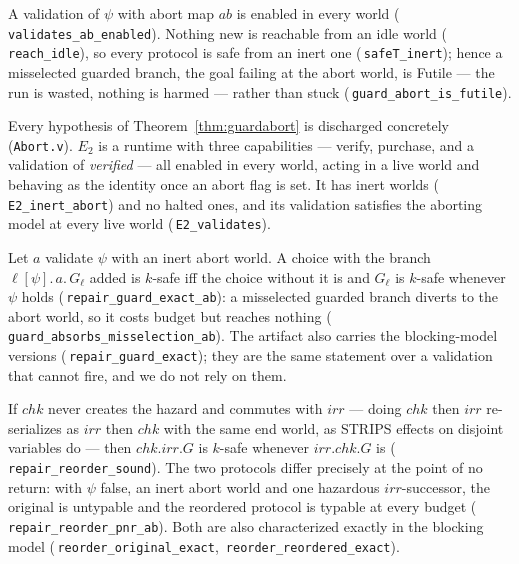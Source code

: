\documentclass[a4paper,UKenglish,cleveref,autoref,thm-restate,anonymous]{lipics-v2021}
\newcommand{\Fut}{\textsf{Futile}}
\newcommand{\coqok}[1]{\textcolor{okgreen}{\ding{51}}\,\texttt{\small #1}}
\begin{document}
\begin{theorem}\label{thm:guardabort}
A validation of $\psi$ with abort map $\mathit{ab}$ is enabled in every world
(\coqok{validates\_ab\_enabled}). Nothing new is reachable from an idle world
(\coqok{reach\_idle}), so every protocol is safe from an inert one
(\coqok{safeT\_inert}); hence a misselected guarded branch, the goal failing at
the abort world, is \Fut{} --- the run is wasted, nothing is harmed --- rather
than stuck (\coqok{guard\_abort\_is\_futile}).
\end{theorem}

Every hypothesis of Theorem~\ref{thm:guardabort} is discharged concretely
(\texttt{Abort.v}). $E_2$ is a runtime with three capabilities --- verify,
purchase, and a validation of \emph{verified} --- all enabled in every world,
acting in a live world and behaving as the identity once an abort flag is set.
It has inert worlds (\coqok{E2\_inert\_abort}) and no halted ones, and its
validation satisfies the aborting model at every live world
(\coqok{E2\_validates}).

\begin{theorem}[Guard]\label{thm:guard}
Let $a$ validate $\psi$ with an inert abort world. A choice with the branch
$\ell[\psi].\,a.\,G_\ell$ added is $k$-safe iff the choice without it is and
$G_\ell$ is $k$-safe whenever $\psi$ holds (\coqok{repair\_guard\_exact\_ab}):
a misselected guarded branch diverts to the abort world, so it costs budget
but reaches nothing (\coqok{guard\_absorbs\_misselection\_ab}). The artifact
also carries the blocking-model versions (\coqok{repair\_guard\_exact}); they
are the same statement over a validation that cannot fire, and we do not rely
on them.
\end{theorem}

\begin{theorem}[Reorder]\label{thm:reorder}
If $\mathit{chk}$ never creates the hazard and commutes with $\mathit{irr}$
--- doing $\mathit{chk}$ then $\mathit{irr}$ re-serializes as $\mathit{irr}$ then
$\mathit{chk}$ with the same end world, as STRIPS effects on disjoint variables
do --- then $\mathit{chk}.\mathit{irr}.G$ is $k$-safe whenever
$\mathit{irr}.\mathit{chk}.G$ is (\coqok{repair\_reorder\_sound}). The two
protocols differ precisely at the point of no return: with $\psi$ false, an
inert abort world and one hazardous $\mathit{irr}$-successor, the original is
untypable and the reordered protocol is typable at every budget
(\coqok{repair\_reorder\_pnr\_ab}). Both are also characterized exactly in the
blocking model (\coqok{reorder\_original\_exact},
\coqok{reorder\_reordered\_exact}).
\end{theorem}
\end{document}
